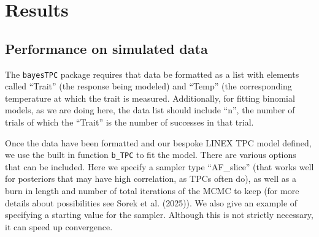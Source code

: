 \documentclass[
  12pt,
]{article}
\newenvironment{Shaded}{\begin{snugshade}}{\end{snugshade}}
\newcommand{\AttributeTok}[1]{\textcolor[rgb]{0.40,0.45,0.13}{#1}}
\newcommand{\FunctionTok}[1]{\textcolor[rgb]{0.28,0.35,0.67}{#1}}
\newcommand{\NormalTok}[1]{\textcolor[rgb]{0.00,0.23,0.31}{#1}}
\newcommand{\OtherTok}[1]{\textcolor[rgb]{0.00,0.23,0.31}{#1}}
\newcommand{\SpecialCharTok}[1]{\textcolor[rgb]{0.37,0.37,0.37}{#1}}
\begin{document}
\section{Results}\label{results}

\subsection{Performance on simulated
data}\label{performance-on-simulated-data}

The \texttt{bayesTPC} package requires that data be formatted as a list
with elements called ``Trait'' (the response being modeled) and ``Temp''
(the corresponding temperature at which the trait is measured.
Additionally, for fitting binomial models, as we are doing here, the
data list should include ``n'', the number of trials of which the
``Trait'' is the number of successes in that trial.

\begin{Shaded}
\end{Shaded}

Once the data have been formatted and our bespoke LINEX TPC model
defined, we use the built in function \texttt{b\_TPC} to fit the model.
There are various options that can be included. Here we specify a
sampler type ``AF\_slice'' (that works well for posteriors that may have
high correlation, as TPCs often do), as well as a burn in length and
number of total iterations of the MCMC to keep (for more details about
possibilities see Sorek et al. (2025)). We also give an example of
specifying a starting value for the sampler. Although this is not
strictly necessary, it can speed up convergence.
\end{document}
